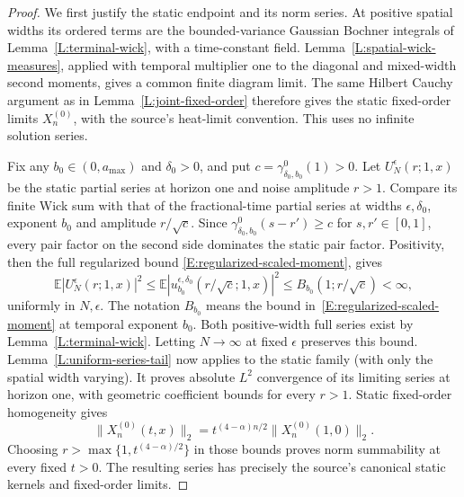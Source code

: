 \documentclass[12pt]{article}
\numberwithin{equation}{section}
\theoremstyle{definition}
\newcommand{\E}{\mathbb{E}}
\begin{document}
\begin{proof}
  We first justify the static endpoint and its norm series.
  At positive spatial widths its ordered terms are the bounded-variance
  Gaussian Bochner integrals of Lemma~\ref{L:terminal-wick}, with a
  time-constant field. Lemma~\ref{L:spatial-wick-measures}, applied with
  temporal multiplier one to the diagonal and mixed-width second
  moments, gives a common finite diagram limit. The same Hilbert
  Cauchy argument as in Lemma~\ref{L:joint-fixed-order} therefore gives
  the static fixed-order limits $X_n^{(0)}$, with the source's heat-limit
  convention. This uses no infinite solution series.

  Fix any $b_0\in(0,a_{\max})$ and $\delta_0>0$, and put
  $c=\gamma_{\delta_0,b_0}^0(1)>0$.
  Let $U_N^\epsilon(r;1,x)$ be the static partial series at horizon one
  and noise amplitude $r>1$. Compare its finite Wick sum with that of
  the fractional-time partial series at widths $\epsilon,\delta_0$,
  exponent $b_0$ and amplitude $r/\sqrt c$.
  Since $\gamma_{\delta_0,b_0}^0(s-r')\ge c$ for $s,r'\in[0,1]$,
  every pair factor on the second side dominates the static pair factor.
  Positivity, then the full regularized bound
  \eqref{E:regularized-scaled-moment}, gives
  \[
    \E|U_N^\epsilon(r;1,x)|^2
    \le \E|u^{\epsilon,\delta_0}_{b_0}(r/\sqrt c;1,x)|^2
    \le B_{b_0}(1;r/\sqrt c)<\infty,
  \]
  uniformly in $N,\epsilon$. The notation $B_{b_0}$ means the bound
  in~\eqref{E:regularized-scaled-moment} at temporal exponent $b_0$.
  Both positive-width full series exist by Lemma~\ref{L:terminal-wick}.
  Letting $N\to\infty$ at fixed $\epsilon$ preserves this bound.
  Lemma~\ref{L:uniform-series-tail} now applies to the static family
  (with only the spatial width varying). It proves absolute $L^2$
  convergence of its limiting series at horizon one, with geometric
  coefficient bounds for every $r>1$.
  Static fixed-order homogeneity gives
  \[
    \|X_n^{(0)}(t,x)\|_2
    =t^{(4-\alpha)n/2}\|X_n^{(0)}(1,0)\|_2.
  \]
  Choosing $r>\max\{1,t^{(4-\alpha)/2}\}$ in those bounds proves
  norm summability at every fixed $t>0$. The resulting series has
  precisely the source's canonical static kernels and fixed-order limits.



\end{proof}
\end{document}
